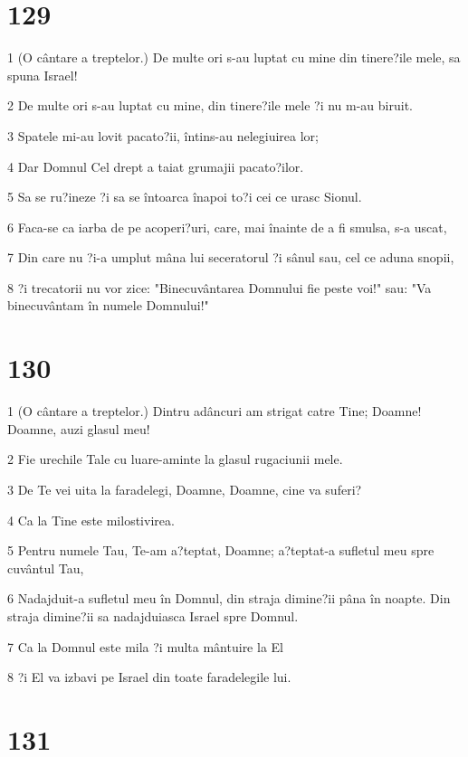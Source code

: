 \chapter{129}

\par 1 (O cântare a treptelor.) De multe ori s-au luptat cu mine din tinere?ile mele, sa spuna Israel!
\par 2 De multe ori s-au luptat cu mine, din tinere?ile mele ?i nu m-au biruit.
\par 3 Spatele mi-au lovit pacato?ii, întins-au nelegiuirea lor;
\par 4 Dar Domnul Cel drept a taiat grumajii pacato?ilor.
\par 5 Sa se ru?ineze ?i sa se întoarca înapoi to?i cei ce urasc Sionul.
\par 6 Faca-se ca iarba de pe acoperi?uri, care, mai înainte de a fi smulsa, s-a uscat,
\par 7 Din care nu ?i-a umplut mâna lui seceratorul ?i sânul sau, cel ce aduna snopii,
\par 8 ?i trecatorii nu vor zice: "Binecuvântarea Domnului fie peste voi!" sau: "Va binecuvântam în numele Domnului!"

\chapter{130}

\par 1 (O cântare a treptelor.) Dintru adâncuri am strigat catre Tine; Doamne! Doamne, auzi glasul meu!
\par 2 Fie urechile Tale cu luare-aminte la glasul rugaciunii mele.
\par 3 De Te vei uita la faradelegi, Doamne, Doamne, cine va suferi?
\par 4 Ca la Tine este milostivirea.
\par 5 Pentru numele Tau, Te-am a?teptat, Doamne; a?teptat-a sufletul meu spre cuvântul Tau,
\par 6 Nadajduit-a sufletul meu în Domnul, din straja dimine?ii pâna în noapte. Din straja dimine?ii sa nadajduiasca Israel spre Domnul.
\par 7 Ca la Domnul este mila ?i multa mântuire la El
\par 8 ?i El va izbavi pe Israel din toate faradelegile lui.

\chapter{131}

